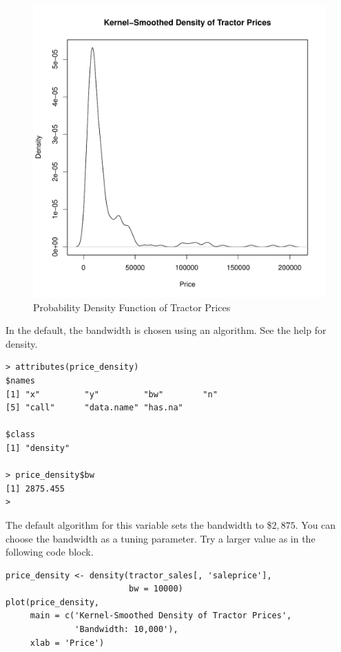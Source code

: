\begin{figure}[h!]
  \centering
  \includegraphics[scale = 0.5, keepaspectratio=true]{../Figures/density_saleprice}
  \caption{Probability Density Function of Tractor Prices} \label{fig:density_saleprice}
\end{figure}

\pagebreak
In the default, the bandwidth is chosen using an algorithm.
See the help for density.

\begin{verbatim}
> attributes(price_density)
$names
[1] "x"         "y"         "bw"        "n"
[5] "call"      "data.name" "has.na"

$class
[1] "density"

> price_density$bw
[1] 2875.455
>
\end{verbatim}

The default algorithm for this variable sets the bandwidth to \$$2,875$.
You can choose the bandwidth as a tuning parameter.
Try a larger value as in the following code block.

\begin{verbatim}
price_density <- density(tractor_sales[, 'saleprice'],
                         bw = 10000)
plot(price_density,
     main = c('Kernel-Smoothed Density of Tractor Prices',
              'Bandwidth: 10,000'),
     xlab = 'Price')
\end{verbatim}

